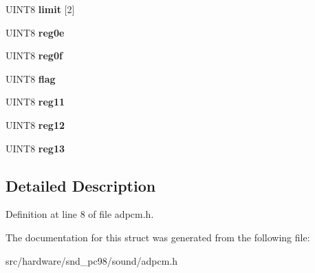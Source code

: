 \begin{DoxyCompactItemize}
\item 
\hypertarget{structADPCMREG_a02d755b5279ce5ec9204810ff64f38e1}{U\-I\-N\-T8 {\bfseries limit} \mbox{[}2\mbox{]}}\label{structADPCMREG_a02d755b5279ce5ec9204810ff64f38e1}

\item 
\hypertarget{structADPCMREG_a7193e33412e88e7cb5148a1e18e8a5b8}{U\-I\-N\-T8 {\bfseries reg0e}}\label{structADPCMREG_a7193e33412e88e7cb5148a1e18e8a5b8}

\item 
\hypertarget{structADPCMREG_ae0b34a1a40b93549109fcb37a57249e5}{U\-I\-N\-T8 {\bfseries reg0f}}\label{structADPCMREG_ae0b34a1a40b93549109fcb37a57249e5}

\item 
\hypertarget{structADPCMREG_a5af727701531b3c4abf4b24ca0acd754}{U\-I\-N\-T8 {\bfseries flag}}\label{structADPCMREG_a5af727701531b3c4abf4b24ca0acd754}

\item 
\hypertarget{structADPCMREG_ab52d85d5497e83367d906284317bc32a}{U\-I\-N\-T8 {\bfseries reg11}}\label{structADPCMREG_ab52d85d5497e83367d906284317bc32a}

\item 
\hypertarget{structADPCMREG_a1c4186c4490c34b600b9d3f7b100077c}{U\-I\-N\-T8 {\bfseries reg12}}\label{structADPCMREG_a1c4186c4490c34b600b9d3f7b100077c}

\item 
\hypertarget{structADPCMREG_ad3d5de02dd0c6820a71970b04d98b744}{U\-I\-N\-T8 {\bfseries reg13}}\label{structADPCMREG_ad3d5de02dd0c6820a71970b04d98b744}

\end{DoxyCompactItemize}


\subsection{Detailed Description}


Definition at line 8 of file adpcm.\-h.



The documentation for this struct was generated from the following file\-:\begin{DoxyCompactItemize}
\item 
src/hardware/snd\-\_\-pc98/sound/adpcm.\-h\end{DoxyCompactItemize}
